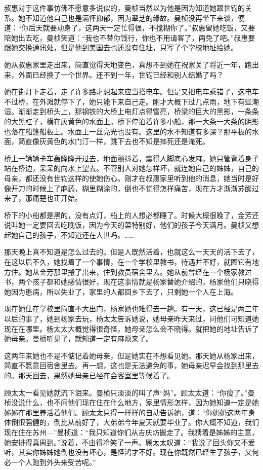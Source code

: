 \par 叔惠对于这件事仿佛不愿意多说似的，曼桢当然以为他是因为知道她跟世钧的关系。她不知道他自己也是满怀抑郁，因为翠芝的缘故。曼桢没再坐下来谈，便道：“你后天就要动身了，这两天一定忙得很，不搅糊你了。”叔惠留她吃饭，又要陪她出去吃，曼桢笑道：“我也不替你饯行，你也不用请客了，两免了吧。”叔惠要跟她交换通讯处，但是他到美国去也还没有住址，只写了个学校地址给她。
\par 她从叔惠家里走出来，简直觉得天地变色，真想不到她在祝家关了将近一年，跑出来，外面已经换了一个世界。还不到一年，世钧已经和别人结婚了吗？
\par 她在街灯下走着，走了许多路才想起来应当搭电车。但是又把电车乘错了，这电车不过桥，在外滩就停下了，她只能下来自己走。刚才大概下过几点雨，地下有些潮湿。渐渐走到桥头上，那钢铁的大桥上电灯点得雪亮，桥梁的巨大的黑影，一条条的大黑杠子，横在灰黄色的水面上。桥下停泊着许多小船，那一大条一大条的阴影也落在船篷船板上。水面上一丝亮光也没有。这里的水不知道有多深？那平板的水面，简直像灰黄色的水门汀一样，跳下去也不知是摔死还是淹死。
\par 桥上一辆辆卡车轰隆隆开过去，地面颤抖着，震得人脚底心发麻。她只管背着身子站在桥边，呆呆的向水上望去。不管别人对她怎样坏，就连她自己的姊姊，自己的母亲，都还没有世钧这样的使她伤心。刚才在叔惠家里听到他的消息，她当时是好像开刀的时候上了麻药，糊里糊涂的，倒也不觉得怎样痛苦，现在方才渐渐苏醒过来了，那痛楚也正开始。
\par 桥下的小船都是黑的，没有点灯，船上的人想必都睡了。时候大概很晚了，金芳还说叫她一定要回去吃晚饭，因为今天的菜特别好，他们的孩子今天满月。曼桢又想起她自己的孩子，不知道还在人世吗。……
\par 那天晚上真不知道是怎么过去的。但是人既然活着，也就这么一天天的活下去了，在这以后不久，她找着了一个事情，在一个学校里教书，待遇并不好，就图它有地方住。她从金芳那里搬了出来，住到教员宿舍里去。她从前曾经在一个杨家教过书，两个孩子都和她感情很好，现在这事情就是杨家替她介绍的，杨家他们只晓得她因为患病，所以失业了，家里的人都回乡下去了，只剩她一个人在上海。
\par 现在她住在学校里简直不大出门，杨家她也难得去一趟。有一天，这已经是两三年以后的事了，她到杨家去玩，杨太太告诉她说，她母亲昨天来过，问他们可知道她现在在哪里。杨太太大概觉得很奇怪，她母亲怎么会不晓得。就把她的地址告诉了她母亲。曼桢听见了，就知道一定有麻烦来了。
\par 这两年来她也不是不惦记着她母亲，但是她实在不想看见她。那天她从杨家出来，简直不愿意回宿舍里去。再一想，这也是无法避免的事，她母亲迟早会找到那里去的。那天回去，果然她母亲已经在会客室里等候着了。
\par 顾太太一看见她就流下泪来。曼桢只淡淡的叫了声“妈”。顾太太道：“你瘦了。”曼桢没说什么，也不问他们现在住在什么地方，家里情形怎样，因为她知道一定是她姊姊在那里养活着他们。顾太太只得一样样的自动告诉她，道：“你奶奶这两年身体倒很强健的，倒比从前好了，大弟弟今年夏天就要毕业了。你大概不知道，我们现在住在苏州—”曼桢道：“我只知道你们从吉庆坊搬走了。我猜着是姊姊的主意，她安排得真周到。”说着，不由得冷笑了一声。顾太太叹道：“我说了回头你又不爱听，其实你姊姊她倒也没有坏心，是怪鸿才不好。现在你既然已经生了孩子，又何必一个人跑到外头来受苦呢。”
